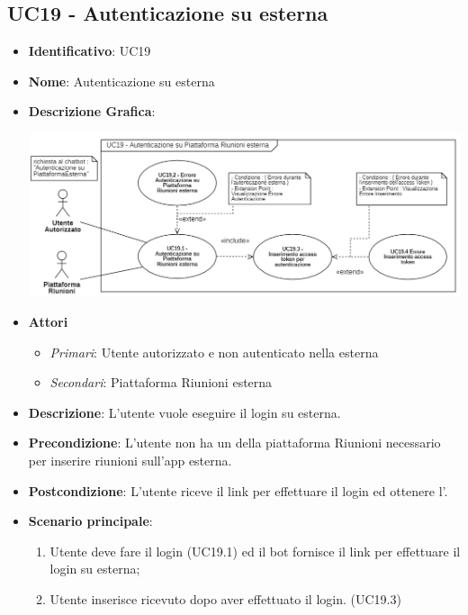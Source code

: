 \subsection{UC19 - Autenticazione su  esterna}
\begin{itemize}
	\item \textbf{Identificativo}: UC19
	\item \textbf{Nome}: Autenticazione su  esterna
	\item\textbf{Descrizione Grafica}: 
	\begin{center}
		\includegraphics[scale=0.65]{images/UC19.png} 
	\end{center}

	\item \textbf{Attori}
	\begin{itemize} 
		\item \textit{Primari}: Utente autorizzato e non autenticato nella  esterna
		\item \textit{Secondari}: Piattaforma Riunioni esterna
	\end{itemize}
	\item \textbf{Descrizione}: L'utente vuole eseguire il login su  esterna.
	\item \textbf{Precondizione}: L'utente non ha un  della piattaforma Riunioni necessario per inserire riunioni sull'app esterna.
	\item \textbf{Postcondizione}: L'utente riceve il link per effettuare il login ed ottenere l'.
	\item \textbf{Scenario principale}: \begin{enumerate}
		\item Utente deve fare il login (UC19.1) ed il bot fornisce il link per effettuare il login su  esterna; 
		\item Utente inserisce  ricevuto dopo aver effettuato il login. (UC19.3)
	\end{enumerate}
\end{itemize}

